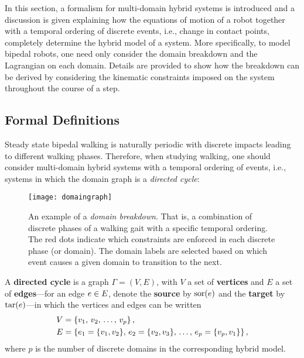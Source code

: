 In this section, a formalism for multi-domain hybrid systems is introduced and a
discussion is given explaining how the equations of motion of a robot together
with a temporal ordering of discrete events, i.e., change in contact points,
completely determine the hybrid model of a system.
%
More specifically, to model bipedal robots, one need only consider the domain
breakdown and the Lagrangian on each domain.
%
Details are provided to show how the breakdown can be derived by considering the
kinematic constraints imposed on the system throughout the course of a step.


\subsection{Formal Definitions}


Steady state bipedal walking is naturally periodic with discrete impacts leading
to different walking phases.
%
Therefore, when studying walking, one should consider multi-domain hybrid
systems with a temporal ordering of events, i.e., systems in which the domain
graph is a {\em directed cycle}:

\begin{figure}[t]
  \centering
  \texttt{[image: domaingraph]}
  \caption[An example of a {\em domain breakdown}.]{An example of a {\em domain
      breakdown}.
    That is, a combination of discrete phases of a walking gait with a specific
    temporal ordering. The red dots indicate which constraints are enforced in
    each discrete phase (or domain).
    The domain labels are selected based on which event causes a given domain to
    transition to the next.}
  \label{fig:domaingraph}
\end{figure}

\begin{definition}
  A {\bf directed cycle} is a graph $\Gamma = (V, E)$, with $V$ a set of {\bf
    vertices} and $E$ a set of {\bf edges}---for an edge $e \in E$, denote the
  {\bf source} by $\mathrm{sor}(e)$ and the {\bf target} by $\mathrm{tar}(e)$---in which the
  vertices and edges can be written
  \begin{align}
    \nonumber
    V &= \left\{v_{1}, \, v_{2}, \, \ldots, \, v_{p}\right\},\\
    \label{eq:directedcyclep}
    E &= \left\{e_{1} = \{v_{1}, v_{2}\}, \, e_{2} = \{v_{2}, v_{3}\}, \,
      \ldots, \, e_{p} = \{v_{p}, v_{1}\}\right\},
  \end{align}
  where $p$ is the number of discrete domains in the corresponding hybrid
  model.
\end{definition}

